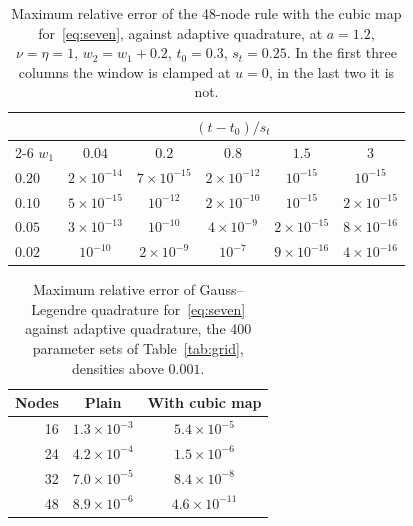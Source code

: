 \documentclass[final,5p,times,twocolumn,authoryear]{elsarticle}
\begin{document}
\begin{table}[t]
\centering
\caption{Maximum relative error of the 48-node rule with the cubic map for~\eqref{eq:seven}, against adaptive quadrature, at $a = 1.2$, $\nu = \eta = 1$, $w_2 = w_1 + 0.2$, $t_0 = 0.3$, $s_t = 0.25$. In the first three columns the window is clamped at $u = 0$, in the last two it is not.}
\label{tab:w1}
\footnotesize
\setlength{\tabcolsep}{4pt}
\begin{tabular}{lccccc}
\toprule
 & \multicolumn{5}{c}{$(t - t_0)/s_t$} \\
\cmidrule(lr){2-6}
$w_1$ & $0.04$ & $0.2$ & $0.8$ & $1.5$ & $3$ \\
\midrule
$0.20$ & $2\times10^{-14}$ & $7\times10^{-15}$ & $2\times10^{-12}$ & $10^{-15}$ & $10^{-15}$ \\
$0.10$ & $5\times10^{-15}$ & $10^{-12}$ & $2\times10^{-10}$ & $10^{-15}$ & $2\times10^{-15}$ \\
$0.05$ & $3\times10^{-13}$ & $10^{-10}$ & $4\times10^{-9}$ & $2\times10^{-15}$ & $8\times10^{-16}$ \\
$0.02$ & $10^{-10}$ & $2\times10^{-9}$  & $10^{-7}$ & $9\times10^{-16}$ & $4\times10^{-16}$ \\
\bottomrule
\end{tabular}
\end{table}

\begin{table}[t]
\centering
\caption{Maximum relative error of Gauss--Legendre quadrature for~\eqref{eq:seven} against adaptive quadrature, the 400 parameter sets of Table~\ref{tab:grid}, densities above $0.001$.}
\label{tab:nodes}
\begin{tabular}{rcc}
\toprule
Nodes & Plain & With cubic map \\
\midrule
16 & $1.3\times10^{-3}$ & $5.4\times10^{-5}$ \\
24 & $4.2\times10^{-4}$ & $1.5\times10^{-6}$ \\
32 & $7.0\times10^{-5}$ & $8.4\times10^{-8}$ \\
48 & $8.9\times10^{-6}$ & $4.6\times10^{-11}$ \\
\bottomrule
\end{tabular}
\end{table}
\end{document}
